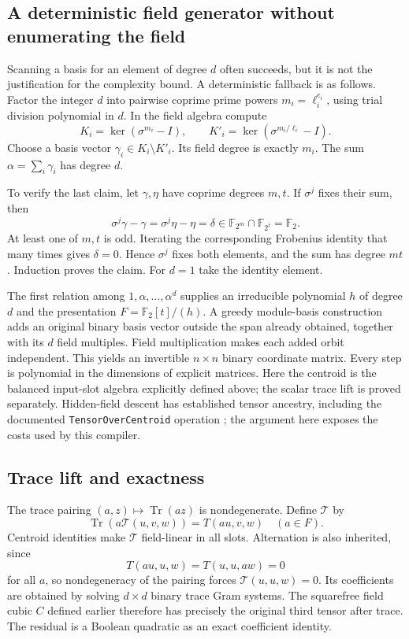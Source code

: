 \documentclass[11pt]{article}
\theoremstyle{remark}\newtheorem{remark}[theorem]{Remark}
\newcommand{\F}{\mathbb F}
\newcommand{\Tr}{\operatorname{Tr}}
\begin{document}
\subsection{A deterministic field generator without enumerating the field}
Scanning a basis for an element of degree $d$ often succeeds, but it is not the justification for the complexity bound. A deterministic fallback is as follows. Factor the integer $d$ into pairwise coprime prime powers $m_i=\ell_i^{e_i}$, using trial division polynomial in $d$. In the field algebra compute
\[
 K_i=\ker(\sigma^{m_i}-I),\qquad
 K'_i=\ker(\sigma^{m_i/\ell_i}-I).
\]
Choose a basis vector $\gamma_i\in K_i\setminus K'_i$. Its field degree is exactly $m_i$. The sum $\alpha=\sum_i\gamma_i$ has degree $d$.

To verify the last claim, let $\gamma,\eta$ have coprime degrees $m,t$. If $\sigma^j$ fixes their sum, then
\[
 \sigma^j\gamma-\gamma=\sigma^j\eta-\eta=\delta
 \in \F_{2^m}\cap\F_{2^t}=\F_2.
\]
At least one of $m,t$ is odd. Iterating the corresponding Frobenius identity that many times gives $\delta=0$. Hence $\sigma^j$ fixes both elements, and the sum has degree $mt$. Induction proves the claim. For $d=1$ take the identity element.

The first relation among $1,\alpha,\ldots,\alpha^d$ supplies an irreducible polynomial $h$ of degree $d$ and the presentation $F=\F_2[t]/(h)$. A greedy module-basis construction adds an original binary basis vector outside the span already obtained, together with its $d$ field multiples. Field multiplication makes each added orbit independent. This yields an invertible $n\times n$ binary coordinate matrix. Every step is polynomial in the dimensions of explicit matrices. Here the centroid is the balanced input-slot algebra explicitly defined above; the scalar trace lift is proved separately. Hidden-field descent has established tensor ancestry, including the documented \texttt{TensorOverCentroid} operation \cite{magma}; the argument here exposes the costs used by this compiler.

\subsection{Trace lift and exactness}
The trace pairing $(a,z)\mapsto\Tr(az)$ is nondegenerate. Define $\mathcal T$ by
\[
 \Tr(a\mathcal T(u,v,w))=T(au,v,w)\quad(a\in F).
\]
Centroid identities make $\mathcal T$ field-linear in all slots. Alternation is also inherited, since
\[
 T(au,u,w)=T(u,u,aw)=0
\]
for all $a$, so nondegeneracy of the pairing forces $\mathcal T(u,u,w)=0$. Its coefficients are obtained by solving $d\times d$ binary trace Gram systems. The squarefree field cubic $C$ defined earlier therefore has precisely the original third tensor after trace. The residual is a Boolean quadratic as an exact coefficient identity.
\end{document}
